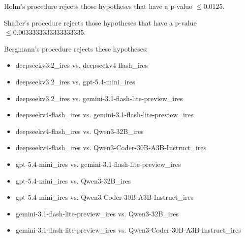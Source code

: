 \documentclass[a4paper,10pt]{article}
\begin{document}
\begin{landscape}
Holm's procedure rejects those hypotheses that have a p-value $\le0.0125$.


Shaffer's procedure rejects those hypotheses that have a p-value $\le0.0033333333333333335$.


Bergmann's procedure rejects these hypotheses:


\begin{itemize}


\item deepseekv3.2_ires vs. deepseekv4-flash_ires\item deepseekv3.2_ires vs. gpt-5.4-mini_ires\item deepseekv3.2_ires vs. gemini-3.1-flash-lite-preview_ires\item deepseekv4-flash_ires vs. gemini-3.1-flash-lite-preview_ires\item deepseekv4-flash_ires vs. Qwen3-32B_ires\item deepseekv4-flash_ires vs. Qwen3-Coder-30B-A3B-Instruct_ires\item gpt-5.4-mini_ires vs. gemini-3.1-flash-lite-preview_ires\item gpt-5.4-mini_ires vs. Qwen3-32B_ires\item gpt-5.4-mini_ires vs. Qwen3-Coder-30B-A3B-Instruct_ires\item gemini-3.1-flash-lite-preview_ires vs. Qwen3-32B_ires\item gemini-3.1-flash-lite-preview_ires vs. Qwen3-Coder-30B-A3B-Instruct_ires\end{itemize}



\end{landscape}
\end{document}
